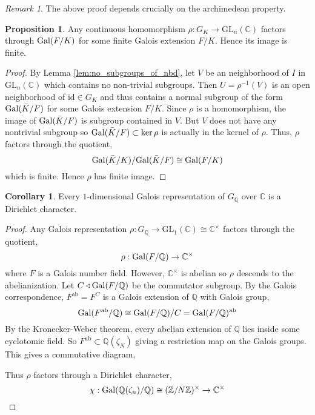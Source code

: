 \documentclass[12pt]{article}
\newcommand{\Z}{\mathbb{Z}}
\newcommand{\C}{\mathbb{C}}
\newcommand{\Q}{\mathbb{Q}}
\newcommand{\Gal}[1]{\mathrm{Gal} \small(#1 \small)}
\newcommand{\id}{\mathrm{id}}
\newcommand{\ab}{\mathrm{ab}}
\newcommand{\GL}[2]{\mathrm{GL}_{#1}(#2)}
\theoremstyle{remark}
\newtheorem*{remark}{Remark}
\theoremstyle{definition}
\newtheorem{proposition}[theorem]{Proposition}
\newtheorem{corollary}[theorem]{Corollary}
\begin{document}
\begin{remark}
The above proof depends crucially on the archimedean property. 
\end{remark}

\begin{proposition}
Any continuous homomorphism $\rho: G_{K} \to \GL{n}{\C}$ factors through $\Gal{F/K}$ for some finite Galois extension $F / K$. Hence its image is finite.
\end{proposition}
\begin{proof}
By Lemma \ref{lem:no_subgroups_of_nbd}, let $V$ be an neighborhood of $I$ in $\GL{n}{\C}$ which contains no non-trivial subgroups. Then $U = \rho^{-1}(V)$ is an open neighborhood of $\id \in G_K$ and thus contains a normal subgroup of the form $\Gal{\bar{K} / F}$ for some Galois extension $F / K$.
Since $\rho$ is a homomorphism, the image of $\Gal{\bar{K} / F}$ is subgroup contained in $V$. But $V$ does not have any nontrivial subgroup so $\Gal{\bar{K} / F } \subset \ker{\rho}$ is actually in the kernel of $\rho$. Thus, $\rho$ factors through the quotient,
\[ \Gal{\bar{K} / K} / \Gal{\bar{K} / F} \cong \Gal{F / K} \]
which is finite. Hence $\rho$ has finite image.
\end{proof}

\begin{corollary}
Every $1$-dimensional Galois representation of $G_{\Q}$ over $\C$ is a Dirichlet character. 
\end{corollary}

\begin{proof}
Any Galois representation $\rho : G_{\Q} \to \GL{1}{\C} \cong \C^\times$ factors through the quotient,
\[ \rho : \Gal{F / \Q} \to \C^\times \]
where $F$ is a Galois number field. However, $\C^\times$ is abelian so $\rho$ descends to the abelianization.
Let $C \triangleleft \Gal{F / \Q}$ be the commutator subgroup. By the Galois correspondence, $F^{\ab} = F^C$ is a Galois extension of $\Q$ with Galois group,
\[ \Gal{F^{\ab} / \Q} \cong \Gal{F / \Q} / C = \Gal{F / \Q}^{\ab} \]
By the Kronecker-Weber theorem, every abelian extension of $\Q$ lies inside some cyclotomic field. So $F^{\ab} \subset \Q(\zeta_N)$ giving a restriction map on the Galois groups. This gives a commutative diagram,
\begin{center}
\end{center}
Thus $\rho$ factors through a Dirichlet character,
\[ \chi : \Gal{ \Q(\zeta_n) / \Q } \cong (\Z / N \Z)^\times \to \C^\times \]
\end{proof}
\end{document}

